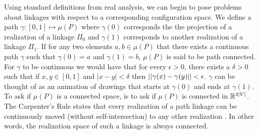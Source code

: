 Using standard definitions from real analysis, we can begin to pose problems about linkages with respect to a corresponding configuration space.  
We define a path $\gamma: [0,1]\mapsto \mu(P)$ where $\gamma(0)$ corresponds the the projection of a realization of a linkage $\Pi_0$ and $\gamma(1)$ corresponds to another realization of a linkage $\Pi_1$.  
If for any two elements $a,b \in \mu(P)$ that there exists a continuous path $\gamma$ such that $\gamma(0)=a$ and $\gamma(1)=b$, $\mu(P)$ is said to be path connected.   
For $\gamma$ to be continuous we would have that for every $\epsilon > 0$, there exists a $\delta >0$ such that if $x,y \in [0,1]$ and $\vert x-y \vert <\delta$ then $\left\vert \left\vert \gamma(x)-\gamma(y) \right\vert \right\vert<\epsilon$.
$\gamma$ can be thought of as an animation of drawings that starts at $\gamma(0)$ and ends at $\gamma(1)$.
To ask if $\mu(P)$ is a connected space, is to ask if $\mu(P)$ is connected in ${\mathbb{R}}^{2\vert V \vert}$.
The Carpenter's Rule states that every realization of a path linkage can be continuously moved (without self-intersection) to any other realization \cite{CDR03,Str05}.
In other words, the realization space of such a linkage is always connected.







